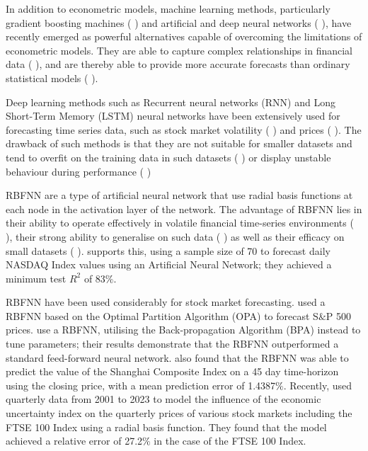 \documentclass[11pt,a4paper]{article}
\newcommand{\citeboth}[1]{\citeauthor{#1} \citep{#1}}
\begin{document}
In addition to econometric models, machine learning methods, 
particularly gradient boosting machines (\citeboth{gumelar,Liu2024,Chen2023}) and artificial and deep neural networks (\citeboth{chen2015lstm,kara2011ann,long2019deep,nelson2017lstm}), have recently emerged as powerful alternatives capable of overcoming the limitations of econometric models. 
They are able to capture complex relationships in financial data (\citeboth{rossi2018ml}), and 
are thereby able to provide more accurate forecasts than ordinary statistical models 
(\citeboth{lapitskaya2021armax}). 


Deep learning methods such as Recurrent neural networks (RNN) and Long Short-Term Memory (LSTM) neural networks
have been extensively used for forecasting time series data, 
such as stock market volatility (\citeboth{cho2022forecasting,praveenraj2023}) and prices (\citeboth{zhang2022lstm,song2023forecasting,dutta2024hybrid}). The drawback of such 
methods is that they are not suitable for smaller datasets and tend to overfit on the training data
in such datasets (\citeboth{foster1992}) or display unstable behaviour during performance (\citeboth{lebaron1998})

RBFNN are a type of artificial 
neural network that use radial basis functions at each node in the 
activation layer of the network.
The advantage of RBFNN lies in their ability to 
operate effectively in volatile financial time-series 
environments (\citeboth{cafferata2019}), their strong ability to 
generalise on such data (\citeboth{sharkawy2020}) as well as their efficacy on small datasets (\citeboth{kosarac2022}). 
\citeboth{esfandyari2016}
supports this, using a sample size of 70 to forecast daily NASDAQ 
Index values using an Artificial Neural Network; they achieved a minimum
test $R^2$ of 83$\%$. 

RBFNN have been used considerably for stock market forecasting. \citeboth{cao2004} 
used a RBFNN based on the Optimal Partition Algorithm (OPA) to 
forecast S$\&$P 500 prices. \citeboth{dass2019} use a RBFNN, utilising the Back-propagation 
Algorithm (BPA) instead to tune parameters; their results demonstrate 
that the RBFNN outperformed a standard feed-forward neural network. 
\citeboth{ji2014} also found that the RBFNN was able to predict the value 
of the Shanghai Composite Index on a 45 day time-horizon using the closing price, with a mean prediction error of 
1.4387$\%$. Recently, \citeboth{abotaleb2024}
used quarterly data from 2001 to 2023 to model the influence of the economic 
uncertainty index on the quarterly prices of various stock markets including the 
FTSE 100 Index using a radial basis function. They found that the model 
achieved a relative error of 27.2$\%$ in the case of the FTSE 100 Index.
\end{document}
